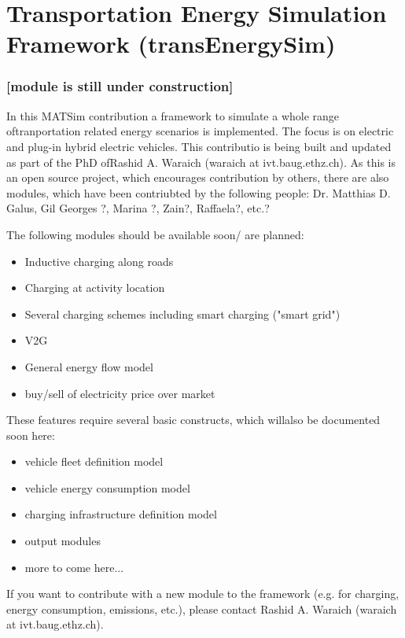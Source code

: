 \documentclass[a4paper,11pt]{report}
\begin{document}

\vfill\eject
\section{Transportation Energy Simulation Framework (transEnergySim)}

\subsubsection{[module is still under construction]}

In this MATSim contribution a framework to simulate a whole range  oftranportation related energy scenarios is implemented. The focus  is on electric and plug-in hybrid electric vehicles. This contributio  is being built and updated as part of the PhD ofRashid A. Waraich  (waraich at ivt.baug.ethz.ch). As this is an open source project, which  encourages contribution by others, there are also modules, which have  been contriubted by the following people: Dr. Matthias D. Galus, Gil  Georges ?, Marina ?, Zain?, Raffaela?, etc.?



The following modules should be available soon/ are planned:
\begin{itemize}
	\item Inductive charging along roads
	\item Charging at activity location
	\item Several charging schemes including smart charging ("smart grid")
	\item V2G
	\item General energy flow model
	\item buy/sell of electricity price over market
\end{itemize}

These features require several basic constructs, which willalso be documented soon here:
\begin{itemize}
	\item vehicle fleet definition model
	\item vehicle energy consumption model
	\item charging infrastructure definition model
	\item output modules
	\item more to come here...
\end{itemize}

If you want to contribute with a new module to the framework  (e.g. for charging, energy consumption, emissions, etc.), please contact  Rashid A. Waraich (waraich at ivt.baug.ethz.ch).
\end{document}
